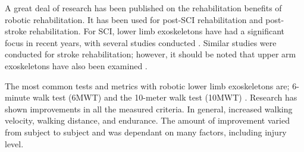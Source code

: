 A great deal of research has been published on the rehabilitation benefits of robotic rehabilitation. It has been used for post-SCI rehabilitation and post-stroke rehabilitation. For SCI, lower limb exoskeletons have had a significant focus in recent years, with several studies conducted \cite{esquenazi2012rewalk} \cite{zeilig2012safety} \cite{6876184}. Similar studies were conducted for stroke rehabilitation; however, it should be noted that upper arm exoskeletons have also been examined \cite{chang2013robot} \cite{ho2011emg}. 

The most common tests and metrics with robotic lower limb exoskeletons are; 6-minute walk test (6MWT) and the 10-meter walk test (10MWT) \cite{amatachaya2014concurrent}. Research has shown improvements in all the measured criteria. In general, increased walking velocity, walking distance, and endurance. The amount of improvement varied from subject to subject and was dependant on many factors, including injury level.   